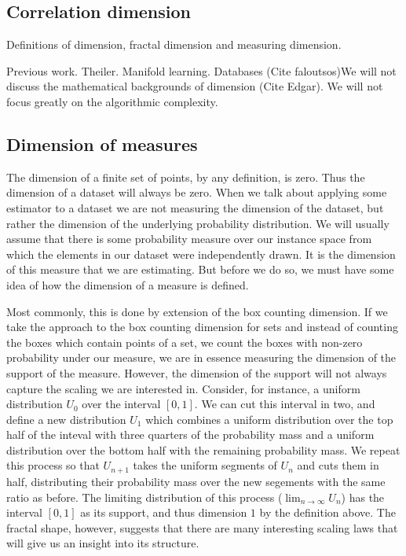 \documentclass[10pt]{article}
\begin{document}
\subsection{Correlation dimension}

Definitions of dimension, fractal dimension and measuring dimension.

Previous work. Theiler. Manifold learning. Databases (Cite faloutsos)We will not discuss the mathematical backgrounds of dimension (Cite Edgar). We will not focus greatly on the algorithmic complexity.

\subsection{Dimension of measures}

The dimension of a finite set of points, by any definition, is zero. Thus the dimension of a dataset will always be zero. When we talk about applying some estimator to a dataset we are not measuring the dimension of the dataset, but rather the dimension of the underlying probability distribution. We will usually assume that there is some probability measure over our instance space from which the elements in our dataset were independently drawn. It is the dimension of this measure that we are estimating. But before we do so, we must have some idea of how the dimension of a measure is defined.

Most commonly, this is done by extension of the box counting dimension. If we take the approach to the box counting dimension for sets and instead of counting the boxes which contain points of a set, we count the boxes with non-zero probability under our measure, we are in essence measuring the dimension of the support of the measure. However, the dimension of the support will not always capture the scaling we are interested in. Consider, for instance, a uniform distribution $U_0$ over the interval $[0, 1]$. We can cut this interval in two, and define a new distribution $U_1$ which combines a uniform distribution over the top half of the inteval with three quarters of the probability mass and a uniform distribution over the bottom half with the remaining probability mass. We repeat this process so that $U_{n+1}$ takes the uniform segments of $U_n$ and cuts them in half, distributing their probability mass over the new segements with the same ratio as before. The limiting distribution of this process ($\lim_{n \rightarrow \infty} U_n$) has the interval $[0, 1]$ as its support, and thus dimension $1$ by the definition above. The fractal shape, however, suggests that there are many interesting scaling laws that will give us an insight into its structure.
\end{document}
